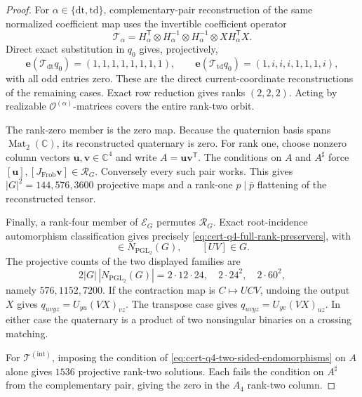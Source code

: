 \documentclass[11pt,letterpaper,onecolumn]{article}
\theoremstyle{plain}
\theoremstyle{definition}
\theoremstyle{remark}
\newcommand{\TetInt}{{\mathcal T^{(\mathrm{int})}}}
\newcommand{\OctForm}[1]{{\mathcal O^{(#1)}}}
\newcommand{\PGL}{\operatorname{PGL}}
\newcommand{\Mat}{\operatorname{Mat}}
\begin{document}
\begin{proof}
For \(\alpha\in\{\mathrm{dt},\mathrm{td}\}\), complementary-pair reconstruction of the
same normalized coefficient map uses the invertible coefficient operator
\begin{equation*}
 \mathscr T_\alpha=
 H_\alpha^{\mathsf T}\otimes H_\alpha^{-1}\otimes H_\alpha^{-1}
 \otimes XH_\alpha^{\mathsf T}X.
\end{equation*}
Direct exact substitution in \(q_0\) gives, projectively,
\begin{equation*}
 \mathbf e(\mathscr T_{\mathrm{dt}}q_0)=(1,1,1,1,1,1,1,1),
 \qquad
 \mathbf e(\mathscr T_{\mathrm{td}}q_0)=(1,i,i,i,1,1,1,i),
\end{equation*}
with all odd entries zero.  These are the direct current-coordinate
reconstructions of the remaining cases.
Exact row reduction gives ranks \((2,2,2)\). Acting by realizable
\(\OctForm{\alpha}\)-matrices covers the entire rank-two orbit.

The rank-zero member is the zero map.  Because the quaternion basis spans
\(\Mat_2(\mathbb C)\), its reconstructed quaternary is zero.
For rank one, choose nonzero column vectors \({\mathbf{u}},{\mathbf{v}}\in\mathbb C^4\) and write
\(A={\mathbf{u}}{\mathbf{v}}^{\mathsf T}\). The conditions on \(A\) and \(A^\sharp\) force
\([{\mathbf{u}}],[J_{\mathrm{Frob}}{\mathbf{v}}]\in\mathcal R_G\). Conversely every such pair works.  This gives
\(|G|^2=144,576,3600\) projective maps and a rank-one
\(p\mid\bar p\) flattening of the reconstructed tensor.

Finally, a rank-four member of \(\mathscr E_G\) permutes
\(\mathcal R_G\).  Exact root-incidence automorphism classification gives
precisely \cref{eq:cert-q4-full-rank-preservers}, with
\begin{equation*}
 [V]\in N_{\PGL_2}(G),\qquad [UV]\in G.
\end{equation*}
The projective counts of the two displayed families are
\begin{equation*}
  2|G|\,|N_{\PGL_2}(G)|
  =2\cdot12\cdot24,\quad2\cdot24^2,\quad2\cdot60^2,
\end{equation*}
namely \(576,1152,7200\).  If the contraction map is
\(C\mapsto UCV\), undoing the output \(X\) gives
\(q_{uvyz}=U_{yu}(VX)_{vz}\). The transpose case gives
\(q_{uvyz}=U_{yv}(VX)_{uz}\).  In either case the quaternary is a product
of two nonsingular binaries on a crossing matching.

For \(\TetInt\), imposing the condition of
\cref{eq:cert-q4-two-sided-endomorphisms} on \(A\) alone gives \(1536\)
projective rank-two solutions. Each fails the condition on \(A^\sharp\)
from the complementary pair, giving the zero in the \(A_4\) rank-two column.


\end{proof}
\end{document}
